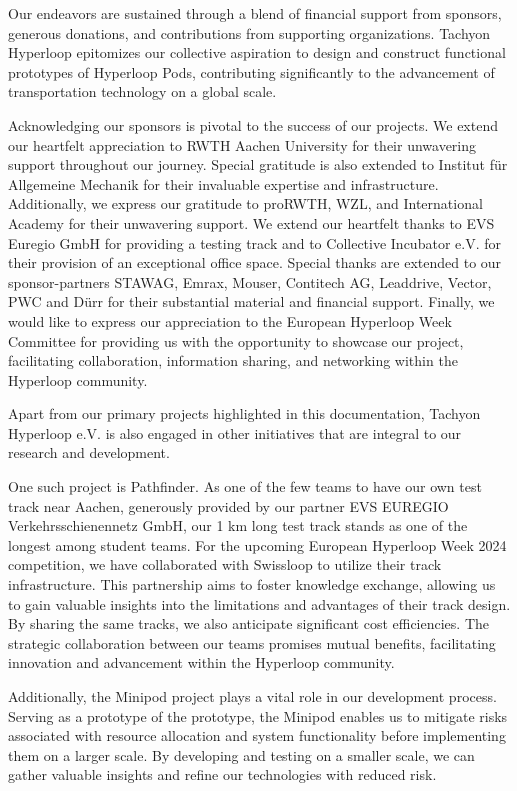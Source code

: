 Our endeavors are sustained through a blend of financial support from sponsors, generous donations, and contributions from supporting organizations. Tachyon Hyperloop epitomizes our collective aspiration to design and construct functional prototypes of Hyperloop Pods, contributing significantly to the advancement of transportation technology on a global scale.

Acknowledging our sponsors is pivotal to the success of our projects. We extend our heartfelt appreciation to RWTH Aachen University for their unwavering support throughout our journey. Special gratitude is also extended to Institut für Allgemeine Mechanik for their invaluable expertise and infrastructure. Additionally, we express our gratitude to proRWTH, WZL, and International Academy for their unwavering support. We extend our heartfelt thanks to EVS Euregio GmbH for providing a testing track and to Collective Incubator e.V. for their provision of an exceptional office space. Special thanks are extended to our sponsor-partners STAWAG, Emrax, Mouser, Contitech AG, Leaddrive, Vector, PWC and Dürr  for their substantial material and financial support. Finally, we would like to express our appreciation to the European Hyperloop Week Committee for providing us with the opportunity to showcase our project, facilitating collaboration, information sharing, and networking within the Hyperloop community.

Apart from our primary projects highlighted in this documentation, Tachyon Hyperloop e.V. is also engaged in other initiatives that are integral to our research and development.

One such project is Pathfinder. As one of the few teams to have our own test track near Aachen, generously provided by our partner EVS EUREGIO Verkehrsschienennetz GmbH, our 1 km long test track stands as one of the longest among student teams. For the upcoming European Hyperloop Week 2024 competition, we have collaborated with Swissloop to utilize their track infrastructure. This partnership aims to foster knowledge exchange, allowing us to gain valuable insights into the limitations and advantages of their track design. By sharing the same tracks, we also anticipate significant cost efficiencies. The strategic collaboration between our teams promises mutual benefits, facilitating innovation and advancement within the Hyperloop community.

Additionally, the Minipod project plays a vital role in our development process. Serving as a prototype of the prototype, the Minipod enables us to mitigate risks associated with resource allocation and system functionality before implementing them on a larger scale. By developing and testing on a smaller scale, we can gather valuable insights and refine our technologies with reduced risk.

